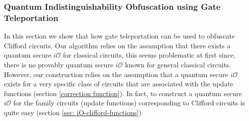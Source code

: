 \begin{comment}
\anote{``reveals no knowledge'' is misleading. Actually, iO can reveal alot of knowledge. The point is that the output of the obfuscators are indistinguishable, which is the case.}


\end{comment}



\subsubsection{Quantum Indistinguishability Obfuscation using Gate Teleportation}
\label{sec:Clifford-iO-teleportaion}
In this section we  show that how gate teleportation can be used to obfuscate Clifford circuits. Our algorithm relies on the assumption that there exists a quantum secure $i\mathcal{O}$ for classical circuits, this seems problematic at first since, there is no provably quantum secure $i\mathcal{O}$ known for general classical circuits. 
However,  our construction relies on the assumption that a quantum secure $i\mathcal{O}$ exists for a very specific class of circuits that are associated with the update functions (section \ref{correction function}). In fact,  to construct a quantum secure $i\mathcal{O}$ for the family circuits (update functions) corresponding to Clifford circuits is quite easy (section \ref{sec: iO-clifford-functions}). 




